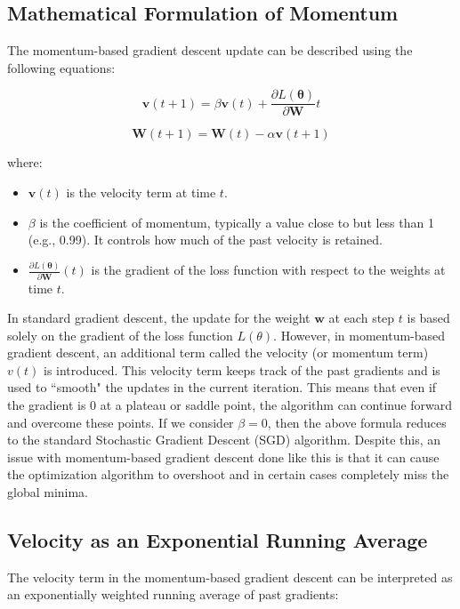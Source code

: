 \documentclass{article}
\begin{document}
\subsection{Mathematical Formulation of Momentum}
The momentum-based gradient descent update can be described using the following equations:

\[
\mathbf{v}(t+1) = \beta \mathbf{v}(t) + \frac{\partial L(\boldsymbol{\theta})}{\partial \mathbf{W}} t
\]

\[
\mathbf{W}(t+1) = \mathbf{W}(t) - \alpha \mathbf{v}(t+1)
\]

where:
\begin{itemize}
    \item \( \mathbf{v}(t) \) is the velocity term at time \( t \).
    \item \( \beta \) is the coefficient of momentum, typically a value close to but less than 1 (e.g., 0.99). It controls how much of the past velocity is retained.
    \item \( \frac{\partial L(\boldsymbol{\theta})}{\partial \mathbf{W}} (t)\) is the gradient of the loss function with respect to the weights at time \( t \).
\end{itemize}

\noindent In standard gradient descent, the update for the weight \( \mathbf{w} \) at each step $t$ is based solely on the gradient of the loss function $L(\theta)$. However, in momentum-based gradient descent, an additional term called the velocity (or momentum term) 
$v(t)$ is introduced. This velocity term keeps track of the past gradients and is used to ``smooth" the updates in the current iteration. This means that even if the gradient is 0 at a plateau or saddle point, the algorithm can continue forward and overcome these points. If we consider $\beta = 0 $, then the above formula reduces to the standard Stochastic Gradient Descent (SGD) algorithm. Despite this, an issue with momentum-based gradient descent done like this is that it can cause the optimization algorithm to overshoot and in certain cases completely miss the global minima.

\subsection{Velocity as an Exponential Running Average}

The velocity term in the momentum-based gradient descent can be interpreted as an exponentially weighted running average of past gradients:
\end{document}
